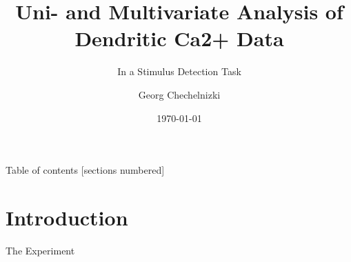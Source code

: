 \documentclass[10pt]{beamer}
\title{Uni- and Multivariate Analysis of Dendritic Ca2+ Data}
\subtitle{In a Stimulus Detection Task}
\date{\today}
\author{Georg Chechelnizki}
\institute{BCCN Berlin}
\begin{document}
\maketitle

\begin{frame}{Table of contents}
  [sections numbered]
  \tableofcontents[hideallsubsections]
\end{frame}

\section{Introduction}

\begin{frame}[fragile]{The Experiment}
\begin{columns}[T,onlytextwidth]
      

\end{columns}
\end{frame}
\end{document}
